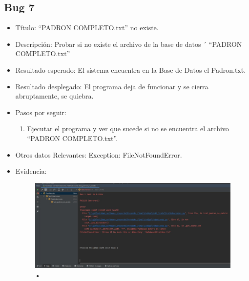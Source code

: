 \documentclass[conference]{IEEEtran}
\begin{document}
\subsection*{Bug 7}
\begin{itemize}
\item Título: “PADRON COMPLETO.txt” no existe.

\item Descripción: Probar si no existe el archivo de la base de datos ´ “PADRON COMPLETO.txt”

\item Resultado esperado: El sistema encuentra en la Base de Datos el 
Padron.txt.

\item Resultado desplegado: El programa deja de funcionar y se cierra abruptamente, se quiebra. 

\item Pasos por seguir: 
\begin{enumerate}
\item Ejecutar el programa y ver que sucede si no se encuentra el archivo “PADRON COMPLETO.txt”.
\end{enumerate}
\item Otros datos Relevantes: Exception: FileNotFoundError.
\item Evidencia:
\begin{figure}[H]
\centering
\includegraphics[scale=0.2]{imagenes/padron_no_existe.jpeg}
\caption{•}
\end{figure}

\end{itemize}
\end{document}
